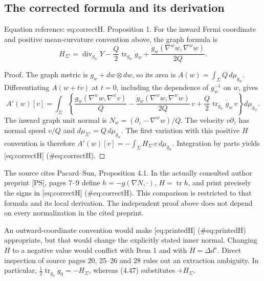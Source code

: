 \documentclass[10pt]{article}
\begin{document}
\subsection*{The corrected formula and its derivation}
Equation reference: eq:correctH. Proposition 1.  For the inward Fermi coordinate and positive mean-curvature convention above, the graph formula is \[
 H_{\Sigma'}=\operatorname{div}_{g_w}Y-
 \frac Q2\operatorname{tr}_{g_w}\dot g_w+
 \frac{\dot g_w(\nabla^w w,\nabla^w w)}{2Q}.\]\par
Proof. The graph metric is \(g_w+dw\otimes dw\), so its area is \(A(w)=\int_\Sigma Q\,d\mu_{g_w}\). Differentiating \(A(w+tv)\) at \(t=0\), including the dependence of \(g_w^{-1}\) on \(w\), gives \[A'(w)[v]=\int_\Sigma
 \left\{\frac{g_w(\nabla^w w,\nabla^w v)}Q
 -\frac{\dot g_w(\nabla^w w,\nabla^w w)}{2Q}\,v
 +\frac Q2\operatorname{tr}_{g_w}\dot g_w\,v\right\}d\mu_{g_w}.\] The inward graph unit normal is \(N_w=(\partial_z-\nabla^w w)/Q\). The velocity \(v\partial_z\) has normal speed \(v/Q\) and \(d\mu_{\Sigma'}=Q\,d\mu_{g_w}\). The first variation with this positive \(H\) convention is therefore \(A'(w)[v]=-\int_\Sigma H_{\Sigma'}v\,d\mu_{g_w}\). Integration by parts yields [eq:correctH] (\#eq:correctH). ◻\par
The source cites Pacard–Sun, Proposition 4.1. In the actually consulted author preprint [PS], pages 7–9 define \(h=-g(\nabla N,\cdot)\), \(H=\operatorname{tr}h\), and print precisely the signs in [eq:correctH] (\#eq:correctH). This comparison is restricted to that formula and its local derivation. The independent proof above does not depend on every normalization in the cited preprint.\par
An outward-coordinate convention would make [eq:printedH] (\#eq:printedH) appropriate, but that would change the explicitly stated inner normal. Changing \(H\) to a negative value would conflict with Item 1 and with \(H=\Delta d^s\). Direct inspection of source pages 20, 25–26 and 28 rules out an extraction ambiguity. In particular, \(\tfrac12\operatorname{tr}_{g_0}\dot g_0=-H_\Sigma\), whereas (4.47) substitutes \(+H_\Sigma\).\par
\end{document}
